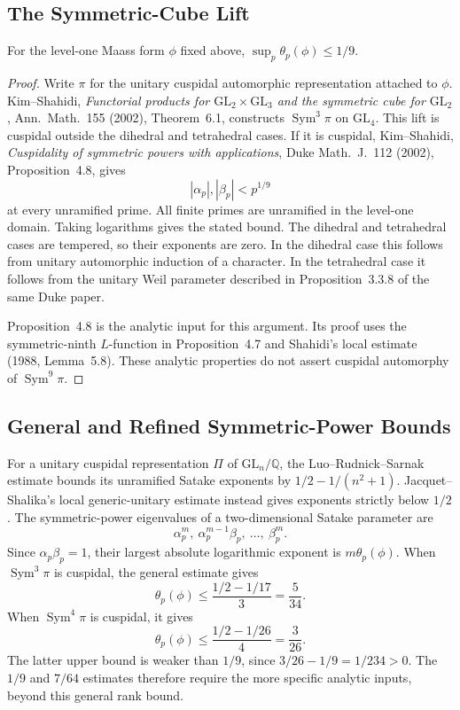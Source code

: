 \subsection{The Symmetric-Cube Lift}
\label{v4-arith:w10-c:construction-A:sym3}

\begin{theorem}
\label{v4-arith:w10-c:thm:KS-1-9}
For the level-one Maass form \(\phi\) fixed above,
\(\sup_p\theta_p(\phi)\leq1/9\).
\end{theorem}

\begin{proof}
Write \(\pi\) for the unitary cuspidal automorphic representation
attached to \(\phi\). Kim--Shahidi,
\emph{Functorial products for \(\mathrm{GL}_2\times\mathrm{GL}_3\)
and the symmetric cube for \(\mathrm{GL}_2\)},
Ann.~Math.~155 (2002), Theorem~6.1, constructs
\(\operatorname{Sym}^3\pi\) on \(\mathrm{GL}_4\).
This lift is cuspidal outside the dihedral and tetrahedral cases.
If it is cuspidal, Kim--Shahidi,
\emph{Cuspidality of symmetric powers with applications},
Duke Math.~J.~112 (2002), Proposition~4.8, gives
\[
|\alpha_p|,|\beta_p|<p^{1/9}
\]
at every unramified prime. All finite primes are unramified in the
level-one domain. Taking logarithms gives the stated bound.
The dihedral and tetrahedral cases are tempered, so their
exponents are zero. In the dihedral case this follows from
unitary automorphic induction of a character. In the tetrahedral
case it follows from the unitary Weil parameter described in
Proposition~3.3.8 of the same Duke paper.

Proposition~4.8 is the analytic input for this argument.
Its proof uses the symmetric-ninth \(L\)-function in
Proposition~4.7 and Shahidi's local estimate
(1988, Lemma~5.8). These analytic properties do not assert
cuspidal automorphy of \(\operatorname{Sym}^9\pi\).
\end{proof}

\subsection{General and Refined Symmetric-Power Bounds}
\label{v4-arith:w10-c:construction-A:delay}

For a unitary cuspidal representation \(\Pi\) of \(\mathrm{GL}_n/\mathbb Q\),
the Luo--Rudnick--Sarnak estimate bounds its unramified Satake
exponents by \(1/2-1/(n^2+1)\).
Jacquet--Shalika's local generic-unitary estimate instead gives
exponents strictly below \(1/2\).
The symmetric-power eigenvalues of a two-dimensional Satake
parameter are
\[
\alpha_p^m,\ \alpha_p^{m-1}\beta_p,\ \ldots,\ \beta_p^m.
\]
Since \(\alpha_p\beta_p=1\), their largest absolute logarithmic
exponent is \(m\theta_p(\phi)\).
When \(\operatorname{Sym}^3\pi\) is cuspidal, the general estimate gives
\[
\theta_p(\phi)\leq\frac{1/2-1/17}{3}=\frac5{34}.
\]
When \(\operatorname{Sym}^4\pi\) is cuspidal, it gives
\[
\theta_p(\phi)\leq\frac{1/2-1/26}{4}=\frac3{26}.
\]
The latter upper bound is weaker than \(1/9\), since
\(3/26-1/9=1/234>0\).
The \(1/9\) and \(7/64\) estimates therefore require the more
specific analytic inputs, beyond this general rank bound.

